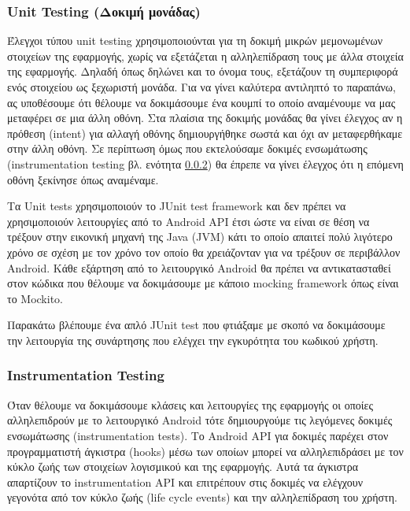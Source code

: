 		\subsubsection{Unit Testing (Δοκιμή μονάδας)}
		Έλεγχοι τύπου unit testing χρησιμοποιούνται για τη δοκιμή μικρών μεμονωμένων στοιχείων της εφαρμογής, χωρίς να εξετάζεται η αλληλεπίδραση τους με άλλα στοιχεία της εφαρμογής. Δηλαδή όπως δηλώνει και το όνομα τους, εξετάζουν τη συμπεριφορά ενός στοιχείου ως ξεχωριστή μονάδα. Για να γίνει καλύτερα αντιληπτό το παραπάνω, ας υποθέσουμε ότι θέλουμε να δοκιμάσουμε ένα κουμπί το οποίο αναμένουμε να μας μεταφέρει σε μια άλλη οθόνη.  Στα πλαίσια της δοκιμής μονάδας θα γίνει έλεγχος αν η πρόθεση (intent) για αλλαγή οθόνης δημιουργήθηκε σωστά και όχι αν μεταφερθήκαμε στην άλλη οθόνη. Σε περίπτωση όμως που εκτελούσαμε δοκιμές ενσωμάτωσης (instrumentation testing βλ. ενότητα \ref{sssec:instrumentation_testing}) θα έπρεπε να γίνει έλεγχος ότι η επόμενη οθόνη ξεκίνησε όπως αναμέναμε.
		
		Τα Unit tests χρησιμοποιούν το JUnit test framework και δεν πρέπει να χρησιμοποιούν λειτουργίες από το Android API έτσι ώστε να είναι σε θέση να τρέξουν στην εικονική μηχανή της Java (JVM) κάτι το οποίο απαιτεί πολύ λιγότερο χρόνο σε σχέση με τον χρόνο τον οποίο θα χρειάζονταν για να τρέξουν σε περιβάλλον Android. Κάθε εξάρτηση από το λειτουργικό Android θα πρέπει να αντικατασταθεί στον κώδικα που θέλουμε να δοκιμάσουμε με κάποιο mocking framework όπως είναι το Mockito. 
		
		Παρακάτω βλέπουμε ένα απλό JUnit test που φτιάξαμε με σκοπό να δοκιμάσουμε την λειτουργία της συνάρτησης που ελέγχει την εγκυρότητα του κωδικού χρήστη.
		
		  

		\subsubsection{Instrumentation Testing}\label{sssec:instrumentation_testing}

		Όταν θέλουμε να δοκιμάσουμε κλάσεις και λειτουργίες της εφαρμογής οι οποίες αλληλεπιδρούν με το λειτουργικό Android τότε δημιουργούμε τις λεγόμενες δοκιμές ενσωμάτωσης (instrumentation tests). Το Android API για δοκιμές παρέχει στον προγραμματιστή άγκιστρα (hooks) μέσω των οποίων μπορεί να αλληλεπιδράσει με τον κύκλο ζωής των στοιχείων λογισμικού και της εφαρμογής. Αυτά τα άγκιστρα απαρτίζουν το instrumentation API και επιτρέπουν στις δοκιμές να ελέγχουν γεγονότα από τον κύκλο ζωής (life cycle events) και την αλληλεπίδραση του χρήστη.

